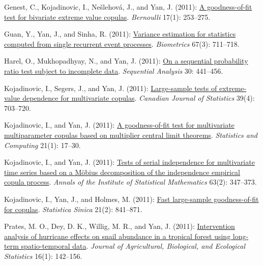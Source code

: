 \begin{RefereedJournalArticles}
\item Genest, C., Kojadinovic, I., Ne\v{s}lehov\'{a}, J., and Yan, J. (2011):
\href{https://doi.org/10.3150/10-bej279}{A goodness-of-fit test for
bivariate extreme value copulas}. \emph{Bernoulli} 17(1): 253--275.

\item Guan, Y., Yan, J., and Sinha, R. (2011):
\href{https://doi.org/10.1111/j.1541-0420.2011.01559.x}{Variance
estimation for statistics computed from single recurrent event
processes}. \emph{Biometrics} 67(3): 711--718.

\item Harel, O., Mukhopadhyay, N., and Yan, J. (2011):
\href{https://doi.org/10.1080/07474946.2011.619103}{On a sequential
probability ratio test subject to incomplete data}. \emph{Sequential
Analysis} 30: 441--456.

\item Kojadinovic, I., Segers, J., and Yan, J. (2011):
\href{https://doi.org/10.1002/cjs.10110}{Large-sample tests of
extreme-value dependence for multivariate copulas}. \emph{Canadian
Journal of Statistics} 39(4): 703--720.

\item Kojadinovic, I., and Yan, J. (2011):
\href{https://doi.org/10.1007/s11222-009-9142-y}{A goodness-of-fit test
for multivariate multiparameter copulas based on multiplier central
limit theorems}. \emph{Statistics and Computing} 21(1): 17--30.

\item Kojadinovic, I., and Yan, J. (2011):
\href{https://doi.org/10.1007/s10463-009-0257-x}{Tests of serial
independence for multivariate time series based on a M\"{o}bius
decomposition of the independence empirical copula process}.
\emph{Annals of the Institute of Statistical Mathematics} 63(2):
347--373.

\item Kojadinovic, I., Yan, J., and Holmes, M. (2011):
\href{https://doi.org/10.5705/ss.2011.037a}{Fast large-sample
goodness-of-fit for copulas}. \emph{Statistica Sinica} 21(2): 841--871.

\item *Prates, M. O., Dey, D. K., Willig, M. R., and Yan, J.
(2011): \href{https://doi.org/10.1007/s13253-010-0039-1}{Intervention
analysis of hurricane effects on snail abundance in a tropical forest
using long-term spatio-temporal data}. \emph{Journal of Agricultural,
Biological, and Ecological Statistics} 16(1): 142--156.


\end{RefereedJournalArticles}
